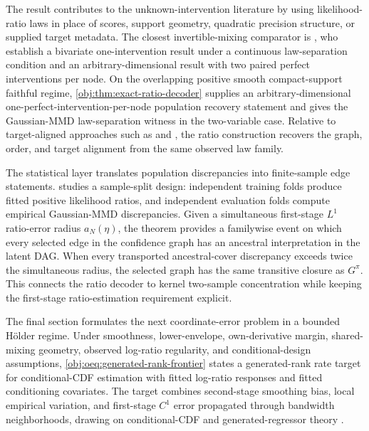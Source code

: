 \documentclass[11pt]{article}
\begin{document}
The result contributes to the unknown-intervention literature by using likelihood-ratio laws in place of scores, support geometry, quadratic precision structure, or supplied target metadata. The closest invertible-mixing comparator is \citet{vonKugelgenEtAl2023UnknownInterventions}, who establish a bivariate one-intervention result under a continuous law-separation condition and an arbitrary-dimensional result with two paired perfect interventions per node. On the overlapping positive smooth compact-support faithful regime, \cref{obj:thm:exact-ratio-decoder} supplies an arbitrary-dimensional one-perfect-intervention-per-node population recovery statement and gives the Gaussian-MMD law-separation witness in the two-variable case. Relative to target-aligned approaches such as \citet{WendongEtAl2023CauCA} and \citet{YaoEtAl2025InvariancePrinciple}, the ratio construction recovers the graph, order, and target alignment from the same observed law family.

The statistical layer translates population discrepancies into finite-sample edge statements.  studies a sample-split design: independent training folds produce fitted positive likelihood ratios, and independent evaluation folds compute empirical Gaussian-MMD discrepancies. Given a simultaneous first-stage \(L^1\) ratio-error radius \(a_N(\eta)\), the theorem provides a familywise event on which every selected edge in the confidence graph has an ancestral interpretation in the latent DAG. When every transported ancestral-cover discrepancy exceeds twice the simultaneous radius, the selected graph has the same transitive closure as \(G^\pi\). This connects the ratio decoder to kernel two-sample concentration \citep{GrettonEtAl2012KernelTwoSample,SchrabEtAl2023MMDAgg} while keeping the first-stage ratio-estimation requirement explicit.

The final section formulates the next coordinate-error problem in a bounded Hölder regime. Under smoothness, lower-envelope, own-derivative margin, shared-mixing geometry, observed log-ratio regularity, and conditional-design assumptions, \cref{obj:oeq:generated-rank-frontier} states a generated-rank rate target for conditional-CDF estimation with fitted log-ratio responses and fitted conditioning covariates. The target combines second-stage smoothing bias, local empirical variation, and first-stage \(C^1\) error propagated through bandwidth neighborhoods, drawing on conditional-CDF and generated-regressor theory \citep{Xie2023UniformConditionalCDF,MammenRotheSchienle2012GeneratedCovariates,Lee2018PartialMeanGeneratedRegressors}.
\end{document}
